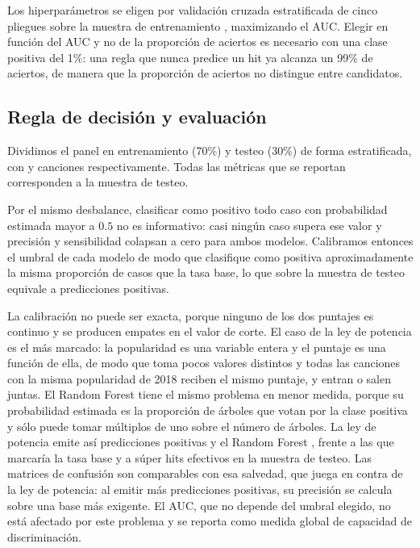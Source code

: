 \documentclass[11pt,a4paper]{article}
\begin{document}
Los hiperparámetros se eligen por validación cruzada estratificada de cinco
pliegues sobre la muestra de entrenamiento \citep{james2021}, maximizando el
AUC. Elegir en
función del AUC y no de la proporción de aciertos es necesario con una clase
positiva del 1\%: una regla que nunca predice un hit ya alcanza un 99\% de
aciertos, de manera que la proporción de aciertos no distingue entre
candidatos.

\subsection{Regla de decisión y evaluación}

Dividimos el panel en entrenamiento (70\%) y testeo (30\%) de forma
estratificada, con \nTrain{} y \nTest{} canciones respectivamente. Todas las
métricas que se reportan corresponden a la muestra de testeo.

Por el mismo desbalance, clasificar como positivo todo caso con probabilidad
estimada mayor a $0.5$ no es informativo: casi ningún caso supera ese valor y
precisión y sensibilidad colapsan a cero para ambos modelos. Calibramos
entonces el umbral de cada modelo de modo que clasifique como positiva
aproximadamente la misma proporción de casos que la tasa base, lo que sobre la
muestra de testeo equivale a \nObjetivo{} predicciones positivas.

La calibración no puede ser exacta, porque ninguno de los dos puntajes es
continuo y se producen empates en el valor de corte. El caso de la ley de
potencia es el más marcado: la popularidad es una variable entera y el puntaje
es una función de ella, de modo que toma pocos valores distintos y todas las
canciones con la misma popularidad de 2018 reciben el mismo puntaje, y entran o
salen juntas. El Random Forest tiene el mismo problema en menor medida, porque
su probabilidad estimada es la proporción de árboles que votan por la clase
positiva y sólo puede tomar múltiplos de uno sobre el número de árboles. La ley
de potencia emite así \nPosPL{} predicciones positivas y el Random Forest
\nPosRF{}, frente a las \nObjetivo{} que marcaría la tasa base y a
\nHitsTest{} súper hits efectivos en la muestra de testeo. Las matrices de confusión son comparables
con esa salvedad, que juega en contra de la ley de potencia: al emitir más
predicciones positivas, su precisión se calcula sobre una base más exigente. El
AUC, que no depende del umbral elegido, no está afectado por este problema y se
reporta como medida global de capacidad de discriminación.
\end{document}
